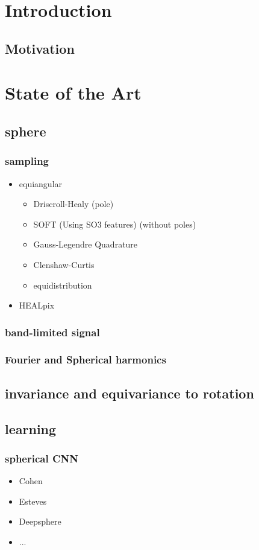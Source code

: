 \documentclass[11pt]{report}
\begin{document}
\chapter{Introduction}
\section{Motivation}

\chapter{State of the Art}
\section{sphere}
\subsection{sampling}
\begin{itemize}
    \item equiangular %
    \begin{itemize}
        \item Driscroll-Healy (pole) %
        \item SOFT (Using SO3 features) (without poles) %
        \item Gauss-Legendre Quadrature
        \item Clenshaw-Curtis
        \item equidistribution
    \end{itemize}
    \item HEALpix
\end{itemize}
\subsection{band-limited signal} %
\subsection{Fourier and Spherical harmonics}
\section{invariance and equivariance to rotation}
\section{learning}
\subsection{spherical CNN}
\begin{itemize}
    \item Cohen
    \item Esteves
    \item Deepsphere
    \item ...
\end{itemize}
\end{document}
